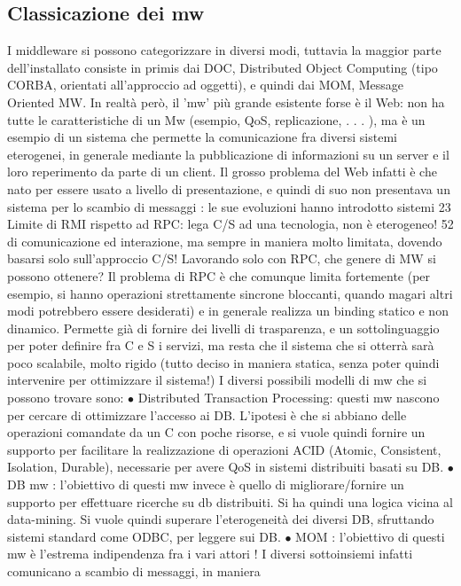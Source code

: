 \subsection{Classicazione dei mw}
I middleware si possono categorizzare in diversi modi, tuttavia la maggior parte
dell'installato consiste in primis dai DOC, Distributed Object Computing (tipo
CORBA, orientati all'approccio ad oggetti), e quindi dai MOM, Message Oriented MW. In realtà però, il 'mw' più grande
esistente forse è il Web: non ha
tutte le caratteristiche di un Mw (esempio, QoS, replicazione, . . . ), ma è un
esempio di un sistema che permette la comunicazione fra diversi sistemi eterogenei, in generale mediante la
pubblicazione di informazioni su un server e il loro
reperimento da parte di un client. Il grosso problema del Web infatti è che nato
per essere usato a livello di presentazione, e quindi di suo non presentava un
sistema per lo scambio di messaggi : le sue evoluzioni hanno introdotto sistemi
23 Limite
di RMI rispetto ad RPC: lega C/S ad una tecnologia, non è eterogeneo!
52
di comunicazione ed interazione, ma sempre in maniera molto limitata, dovendo
basarsi solo sull'approccio C/S!
Lavorando solo con RPC, che genere di MW si possono ottenere? Il problema
di RPC è che comunque limita fortemente (per esempio, si hanno operazioni
strettamente sincrone bloccanti, quando magari altri modi potrebbero essere
desiderati) e in generale realizza un binding statico e non dinamico. Permette
già di fornire dei livelli di trasparenza, e un sottolinguaggio per poter definire
fra C e S i servizi, ma resta che il sistema che si otterrà sarà poco scalabile,
molto rigido (tutto deciso in maniera statica, senza poter quindi intervenire per
ottimizzare il sistema!)
I diversi possibili modelli di mw che si possono trovare sono:
$\bullet$ Distributed Transaction Processing: questi mw nascono per cercare di
ottimizzare l'accesso ai DB. L'ipotesi è che si abbiano delle operazioni
comandate da un C con poche risorse, e si vuole quindi fornire un supporto
per facilitare la realizzazione di operazioni ACID (Atomic, Consistent,
Isolation, Durable), necessarie per avere QoS in sistemi distribuiti basati
su DB.
$\bullet$ DB mw : l'obiettivo di questi mw invece è quello di migliorare/fornire un
supporto per effettuare ricerche su db distribuiti. Si ha quindi una logica
vicina al data-mining. Si vuole quindi superare l'eterogeneità dei diversi
DB, sfruttando sistemi standard come ODBC, per leggere sui DB.
$\bullet$ MOM : l'obiettivo di questi mw è l'estrema indipendenza fra i vari attori ! I
diversi sottoinsiemi infatti comunicano a scambio di messaggi, in maniera
